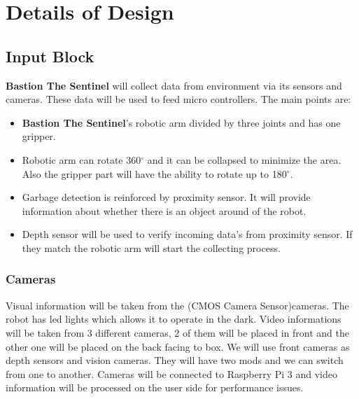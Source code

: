 \documentclass[12pt,a4paper]{article}
\begin{document}
 \section{Details of Design}
  
   \subsection{Input Block}
    \begin{flushleft}
     \textbf{Bastion The Sentinel} will collect data from environment via its sensors and cameras. These data will be used to 
     feed micro controllers. The main points are:
     \begin{itemize}
      \item \textbf{Bastion The Sentinel}'s robotic arm divided by three joints and has one gripper.
      \item Robotic arm can rotate 360$^{\circ}$ and it can be collapsed to minimize the area. Also the gripper part will 
      have the ability to rotate up to 180$^{\circ}$.
      \item Garbage detection is reinforced by proximity sensor. It will provide information about whether there is an object around 
      of the robot.
      \item Depth sensor will be used to verify incoming data's from proximity sensor. If they match the robotic arm will start the 
      collecting process.
     \end{itemize}

    \end{flushleft}

    \subsubsection{Cameras}
     \begin{flushleft}
      Visual information will be taken from the (CMOS Camera Sensor)cameras. The robot has led lights which allows it to 
      operate in the dark. Video informations will be taken from 3 different cameras, 2 of them will be placed 
      in front and the other one will be placed on the back facing to box. We will use front cameras as depth sensors and vision 
      cameras. They will have two mods and we can switch from one to another. Cameras will be connected to Raspberry Pi 3 and 
      video information will be processed on the user side for performance issues.
     \end{flushleft}
     
\end{document}
